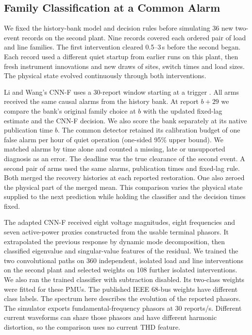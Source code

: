\subsection{Family Classification at a Common Alarm}
\label{sec:second-family-design}

We fixed the history-bank model and decision rules before simulating 36
new two-event records on the second plant. Nine
records covered each ordered pair of load and line families. The first
intervention cleared 0.5--3\,s before the second began. Each record used
a different quiet startup from earlier runs on this plant, then fresh instrument
innovations and new draws of sites, switch times and load sizes. The
physical state evolved continuously through both interventions.

Li and Wang's CNN-F uses a 30-report window starting at a trigger
\cite{liwang2019successive}. All arms received the same causal alarms
from the history bank. At report $b+29$ we compare the bank's original
family choice at $b$ with the updated fixed-lag estimate and the CNN-F
decision. We also score the bank separately at its
native publication time $b$.
The common detector retained its calibration budget of one false alarm
per hour of quiet operation (one-sided 95\% upper bound).
We matched alarms by time alone and counted a missing, late or
unsupported diagnosis as an error. The deadline was the true clearance
of the second event. A second pair of arms used the same alarms,
publication times and fixed-lag rule. Both merged the recovery histories
at each reported restoration. One also zeroed the physical part of the
merged mean. This comparison varies the physical state supplied to the
next prediction while holding the classifier and the decision times fixed.

The adapted CNN-F received eight voltage magnitudes, eight frequencies
and seven active-power proxies constructed from the usable terminal phasors. It
extrapolated the previous response by dynamic mode decomposition, then
classified eigenvalue and singular-value features of the residual.
We trained the two convolutional paths on 360 independent, isolated
load and line interventions on the second plant and selected weights
on 108 further isolated interventions. We also ran the trained classifier
with subtraction disabled. Its two-class weights were fitted for these
PMUs. The published IEEE 68-bus weights have different class labels.
The spectrum here describes the evolution of the reported phasors.
The simulator exports fundamental-frequency phasors at 30 reports/s.
Different current waveforms can share those phasors and have different
harmonic distortion, so the comparison uses no current THD feature.
